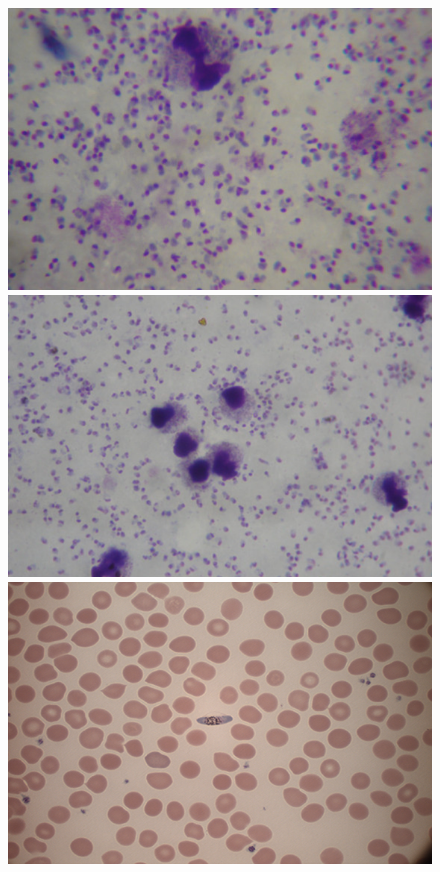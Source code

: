 \documentclass[sensors,review,submit,moreauthors,pdftex,10pt,a4paper]{mdpi}
\begin{document}
\begin{figure}[!t]
	\centering
	\includegraphics[height=0.15\textheight]{img/f3_ThickGiemsa}
	\includegraphics[height=0.15\textheight]{img/f3_ThickLeishman}
	\includegraphics[height=0.15\textheight]{img/f3_ThinGiemsa}

\end{figure}
\end{document}
